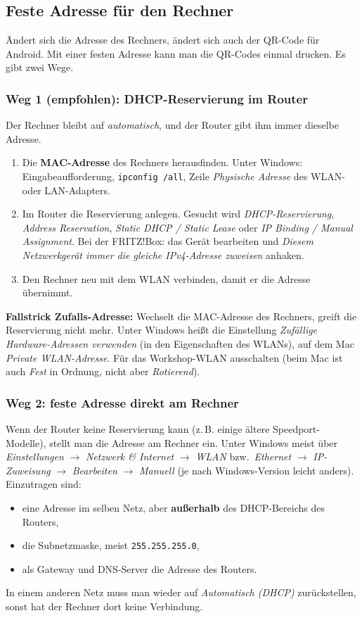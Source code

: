 \documentclass[a4paper,11pt]{article}
\newcommand{\pfeil}{\ensuremath{\rightarrow}}
\begin{document}
\subsection{Feste Adresse für den Rechner}\label{sec:feste-ip}

Ändert sich die Adresse des Rechners, ändert sich auch der QR-Code für Android. Mit einer festen Adresse kann man die
QR-Codes einmal drucken. Es gibt zwei Wege.

\subsubsection*{Weg 1 (empfohlen): DHCP-Reservierung im Router}

Der Rechner bleibt auf \emph{automatisch}, und der Router gibt ihm immer dieselbe Adresse.
\begin{enumerate}
  \item Die \textbf{MAC-Adresse} des Rechners herausfinden. Unter Windows: Eingabeaufforderung, \texttt{ipconfig /all}, Zeile
  \emph{Physische Adresse} des WLAN- oder LAN-Adapters.
  \item Im Router die Reservierung anlegen. Gesucht wird \emph{DHCP-Reservierung}, \emph{Address Reservation},
  \emph{Static DHCP / Static Lease} oder \emph{IP Binding / Manual Assignment}. Bei der FRITZ!Box: das Gerät bearbeiten und
  \emph{Diesem Netzwerkgerät immer die gleiche IPv4-Adresse zuweisen} anhaken.
  \item Den Rechner neu mit dem WLAN verbinden, damit er die Adresse übernimmt.
\end{enumerate}
\textbf{Fallstrick Zufalls-Adresse:} Wechselt die MAC-Adresse des Rechners, greift die Reservierung nicht mehr. Unter
Windows heißt die Einstellung \emph{Zufällige Hardware-Adressen verwenden} (in den Eigenschaften des WLANs), auf dem Mac
\emph{Private WLAN-Adresse}. Für das Workshop-WLAN ausschalten (beim Mac ist auch \emph{Fest} in Ordnung, nicht aber
\emph{Rotierend}).

\subsubsection*{Weg 2: feste Adresse direkt am Rechner}

Wenn der Router keine Reservierung kann (z.\,B. einige ältere Speedport-Modelle), stellt man die Adresse am Rechner ein. Unter
Windows meist über \emph{Einstellungen} \pfeil{} \emph{Netzwerk \& Internet} \pfeil{} \emph{WLAN} bzw.\ \emph{Ethernet} \pfeil{}
\emph{IP-Zuweisung} \pfeil{} \emph{Bearbeiten} \pfeil{} \emph{Manuell} (je nach Windows-Version leicht anders). Einzutragen sind:
\begin{itemize}
  \item eine Adresse im selben Netz, aber \textbf{außerhalb} des DHCP-Bereichs des Routers,
  \item die Subnetzmaske, meist \texttt{255.255.255.0},
  \item als Gateway und DNS-Server die Adresse des Routers.
\end{itemize}
In einem anderen Netz muss man wieder auf \emph{Automatisch (DHCP)} zurückstellen, sonst hat der Rechner dort keine
Verbindung.
\end{document}
